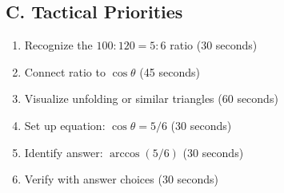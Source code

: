 \documentclass[11pt]{article}
\begin{document}
\begin{tacticalbox}
\subsection*{C. Tactical Priorities}
\begin{enumerate}[leftmargin=*]
    \item Recognize the $100:120 = 5:6$ ratio (30 seconds)
    \item Connect ratio to $\cos\theta$ (45 seconds)
    \item Visualize unfolding or similar triangles (60 seconds)
    \item Set up equation: $\cos\theta = 5/6$ (30 seconds)
    \item Identify answer: $\arccos(5/6)$ (30 seconds)
    \item Verify with answer choices (30 seconds)
\end{enumerate}
\end{tacticalbox}
\end{document}
